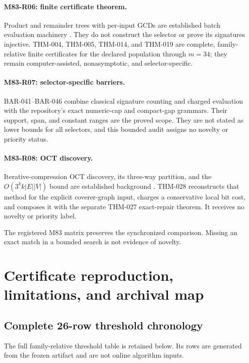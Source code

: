 \documentclass[11pt]{article}
\begin{document}
\paragraph{M83-R06: finite certificate theorem.}
Product and remainder trees with per-input GCDs are established batch
evaluation machinery \cite{bernstein2004smoothparts}. They do not construct
the selector or prove its signatures injective. THM-004, THM-005, THM-014,
and THM-019 are complete, family-relative finite certificates for the
declared population through \(m=34\); they remain computer-assisted,
nonasymptotic, and selector-specific.

\paragraph{M83-R07: selector-specific barriers.}
BAR-041--BAR-046 combine classical signature counting and charged evaluation
with the repository's exact numeric-cap and compact-gap grammars. Their
support, span, and constant ranges are the proved scope. They are not stated
as lower bounds for all selectors, and this bounded audit assigns no novelty
or priority status.

\paragraph{M83-R08: OCT discovery.}
Iterative-compression OCT discovery, its three-way partition, and the
\(O(3^k k|E||V|)\) bound are established background
\cite{lokshtanov2009oct}. THM-028 reconstructs that method for the explicit
coverer-graph input, charges a conservative local bit cost, and composes it
with the separate THM-027 exact-repair theorem. It receives no novelty or
priority label.

The registered M83 matrix preserves the synchronized comparison. Missing an
exact match in a bounded search is not evidence of novelty.

\section{Certificate reproduction, limitations, and archival map}
\label{app:finite-reproduction}

\subsection{Complete 26-row threshold chronology}

The full family-relative threshold table is retained below.  Its rows are
generated from the frozen artifact and are not online algorithm inputs.
\end{document}
